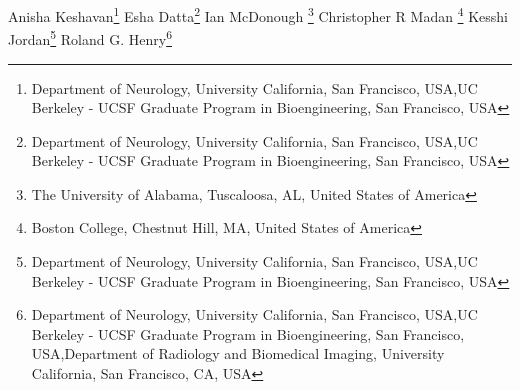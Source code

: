 \iflatexml
Anisha Keshavan\footnote[1,2]{Department of Neurology, University California, San Francisco,  USA,UC Berkeley - UCSF Graduate Program in Bioengineering, San Francisco, USA}
Esha Datta\footnote[1,2]{Department of Neurology, University California, San Francisco,  USA,UC Berkeley - UCSF Graduate Program in Bioengineering, San Francisco, USA}
Ian McDonough \footnote[3] {The University of Alabama, Tuscaloosa, AL, United States of America}
Christopher R Madan \footnote[4]{Boston College, Chestnut Hill, MA, United States of America}
Kesshi Jordan\footnote[1,2]{Department of Neurology, University California, San Francisco,  USA,UC Berkeley - UCSF Graduate Program in Bioengineering, San Francisco, USA}
Roland G. Henry\footnote[1,2,5]{Department of Neurology, University California, San Francisco,  USA,UC Berkeley - UCSF Graduate Program in Bioengineering, San Francisco, USA,Department of Radiology and Biomedical Imaging, University California, San Francisco, CA, USA}

\else %

\author[l1,l2]{Anisha Keshavan}

\author[l1,l2]{Esha Datta}

\author[3]{Ian McDonough}

\author[4]{Christopher R Madan}

\author[l1,l2]{Kesshi Jordan}

\author[l1,l2,5]{Roland G. Henry}

\address[l1]{Department of Neurology, University California, San Francisco,  USA}
\address[l2]{UC Berkeley - UCSF Graduate Program in Bioengineering, San Francisco, USA}
\address[3]{The University of Alabama, Tuscaloosa, AL, United States of America}
\address[4]{Boston College, Chestnut Hill, MA, United States of America}
\address[5]{Department of Radiology and Biomedical Imaging, University California, San Francisco, CA, USA}

\fi